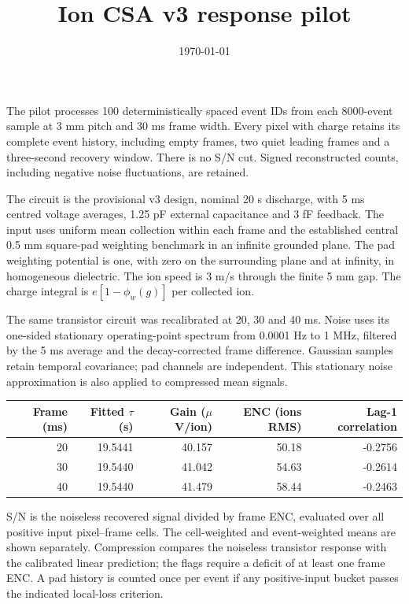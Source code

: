 \documentclass[10pt,a4paper]{article}
\title{Ion CSA v3 response pilot}
\date{\today}
\begin{document}
\maketitle
The pilot processes 100 deterministically spaced event IDs from each 8000-event
sample at 3 mm pitch and 30 ms frame width. Every pixel with charge retains its
complete event history, including empty frames, two quiet leading frames and a
three-second recovery window. There is no S/N cut. Signed reconstructed counts,
including negative noise fluctuations, are retained.

The circuit is the provisional v3 design, nominal 20 s discharge, with 5 ms
centred voltage averages, 1.25 pF external capacitance and 3 fF feedback. The input
uses uniform mean collection within each frame and the established central
0.5 mm square-pad weighting benchmark in an infinite grounded plane. The pad
weighting potential is one, with zero on the surrounding plane and at infinity,
in homogeneous dielectric. The ion speed is 3 m/s through the finite 5 mm gap.
The charge integral is $e[1-\phi_w(g)]$ per collected ion.

The same transistor circuit was recalibrated at 20, 30 and 40 ms. Noise uses its
one-sided stationary operating-point spectrum from 0.0001 Hz to 1 MHz, filtered
by the 5 ms average and the decay-corrected frame difference. Gaussian samples
retain temporal covariance; pad channels are independent. This stationary noise
approximation is also applied to compressed mean signals.
\begin{center}\begin{tabular}{rrrrr}\toprule
Frame (ms) & Fitted $\tau$ (s) & Gain ($\mu$V/ion) & ENC (ions RMS) & Lag-1 correlation\\\midrule
20 & 19.5441 & 40.157 & 50.18 & -0.2756 \\
30 & 19.5440 & 41.042 & 54.63 & -0.2614 \\
40 & 19.5440 & 41.479 & 58.44 & -0.2463 \\
\bottomrule\end{tabular}\end{center}

S/N is the noiseless recovered signal divided by frame ENC, evaluated over all
positive input pixel--frame cells. The cell-weighted and event-weighted means
are shown separately. Compression compares the noiseless transistor response
with the calibrated linear prediction; the flags require a deficit of at least
one frame ENC. A pad history is counted once per event if any positive-input
bucket passes the indicated local-loss criterion.
\end{document}

